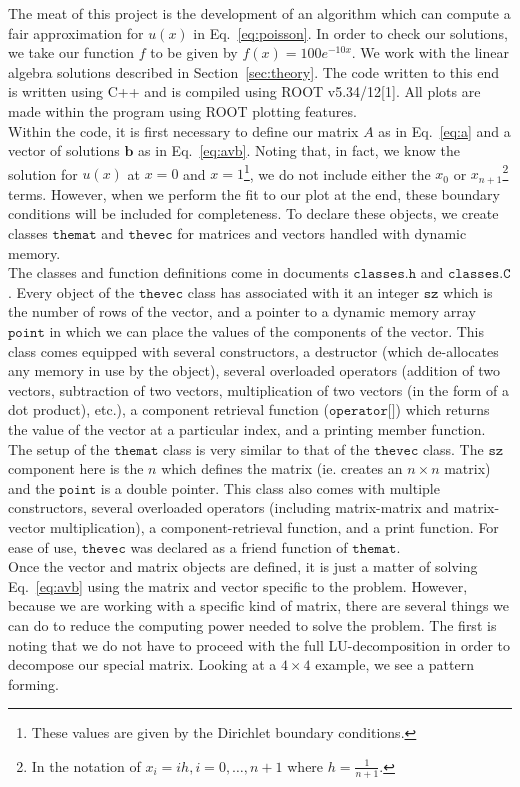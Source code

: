 \documentclass[12pt]{article}
\numberwithin{equation}{section}
\begin{document}
The meat of this project is the development of an algorithm which can compute a fair approximation for $u\left(x\right)$ in Eq.~\ref{eq:poisson}.  In order to check our solutions, we take our function $f$ to be given by $f\left(x\right) = 100e^{-10x}$.  We work with the linear algebra solutions described in Section~\ref{sec:theory}.  The code written to this end is written using C++ and is compiled using ROOT v5.34/12[1].  All plots are made within the program using ROOT plotting features.
\\\indent Within the code, it is first necessary to define our matrix $A$ as in Eq.~\ref{eq:a} and a vector of solutions $\textbf{b}$ as in Eq.~\ref{eq:avb}.  Noting that, in fact, we know the solution for $u\left(x\right)$ at $x=0$ and $x=1$\footnote{These values are given by the Dirichlet boundary conditions.}, we do not include either the $x_{0}$ or $x_{n+1}$\footnote{In the notation of $x_{i}=ih,i=0,\ldots,n+1$ where $h=\frac{1}{n+1}$.} terms.  However, when we perform the fit to our plot at the end, these boundary conditions will be included for completeness.  To declare these objects, we create classes $\texttt{themat}$ and $\texttt{thevec}$ for matrices and vectors handled with dynamic memory. 
\\\indent The classes and function definitions come in documents $\texttt{classes.h}$ and $\texttt{classes.C}$.  Every object of the $\texttt{thevec}$ class has associated with it an integer $\texttt{sz}$ which is the number of rows of the vector, and a pointer to a dynamic memory array $\texttt{point}$ in which we can place the values of the components of the vector.  This class comes equipped with several constructors, a destructor (which de-allocates any memory in use by the object), several overloaded operators (addition of two vectors, subtraction of two vectors, multiplication of two vectors (in the form of a dot product), etc.), a component retrieval function ($\texttt{operator[]}$) which returns the value of the vector at a particular index, and a printing member function.  
\\\indent The setup of the $\texttt{themat}$ class is very similar to that of the $\texttt{thevec}$ class.  The $\texttt{sz}$ component here is the $n$ which defines the matrix (ie. creates an $n\times n$ matrix) and the $\texttt{point}$ is a double pointer.  This class also comes with multiple constructors, several overloaded operators (including matrix-matrix and matrix-vector multiplication), a component-retrieval function, and a print function.  For ease of use, $\texttt{thevec}$ was declared as a friend function of $\texttt{themat}$.  
\\\indent Once the vector and matrix objects are defined, it is just a matter of solving Eq.~\ref{eq:avb} using the matrix and vector specific to the problem.  However, because we are working with a specific kind of matrix, there are several things we can do to reduce the computing power needed to solve the problem.  The first is noting that we do not have to proceed with the full LU-decomposition in order to decompose our special matrix.  Looking at a $4\times4$ example, we see a pattern forming. 
\end{document}

